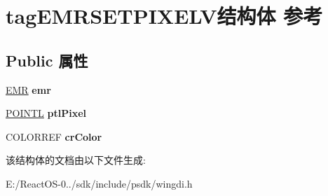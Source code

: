 \hypertarget{structtag_e_m_r_s_e_t_p_i_x_e_l_v}{}\section{tag\+E\+M\+R\+S\+E\+T\+P\+I\+X\+E\+L\+V结构体 参考}
\label{structtag_e_m_r_s_e_t_p_i_x_e_l_v}
\subsection*{Public 属性}
\begin{DoxyCompactItemize}
\item 
\mbox{\label{structtag_e_m_r_s_e_t_p_i_x_e_l_v_aba53e7f99f5467ffc2650acb84de697a}} 
\hyperlink{structtag_e_m_r}{E\+MR} {\bfseries emr}
\item 
\mbox{\label{structtag_e_m_r_s_e_t_p_i_x_e_l_v_a6edd73bc5f62e805e2e9f614c2586e6b}} 
\hyperlink{struct___p_o_i_n_t_l}{P\+O\+I\+N\+TL} {\bfseries ptl\+Pixel}
\item 
\mbox{\label{structtag_e_m_r_s_e_t_p_i_x_e_l_v_ab46b6d50bada1b47e725949b25c2722c}} 
C\+O\+L\+O\+R\+R\+EF {\bfseries cr\+Color}
\end{DoxyCompactItemize}


该结构体的文档由以下文件生成\+:\begin{DoxyCompactItemize}
\item 
E\+:/\+React\+O\+S-\/0../sdk/include/psdk/wingdi.\+h\end{DoxyCompactItemize}
